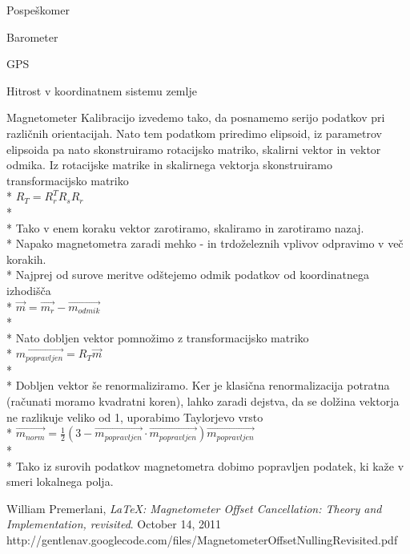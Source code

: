 \documentclass[]{article}
\begin{document}
\begin {subsection}{Pospeškomer}
\begin {subsection}{Barometer}
\begin {subsection}{GPS}
\begin {subsection}{Hitrost v koordinatnem sistemu zemlje}
\begin {subsection}{Magnetometer}
Kalibracijo izvedemo tako, da posnamemo serijo podatkov pri različnih orientacijah. Nato tem podatkom priredimo elipsoid, iz parametrov elipsoida pa nato skonstruiramo rotacijsko matriko, skalirni vektor in vektor odmika.
Iz rotacijske matrike in skalirnega vektorja skonstruiramo transformacijsko matriko\\*
$ R_{T} = R^{T}_{r}  R_{s}  R_{r} $\\*\\*
Tako v enem koraku vektor zarotiramo, skaliramo in zarotiramo nazaj.\\*
Napako magnetometra zaradi mehko - in trdoželeznih vplivov odpravimo v več korakih.\\*
Najprej od surove meritve odštejemo odmik podatkov od koordinatnega izhodišča\\*
$ \vec{m} = \vec{m_{r}} - \vec{m_{odmik}}  $\\*\\*
Nato dobljen vektor pomnožimo z transformacijsko matriko\\*
$ \vec{m_{popravljen}} = R_{T} \vec{m} $\\*\\*
Dobljen vektor še renormaliziramo. Ker je klasična renormalizacija potratna (računati moramo kvadratni koren), lahko zaradi dejstva, da se dolžina vektorja ne razlikuje veliko od 1, uporabimo Taylorjevo vrsto\\*
$ \vec{m_{norm}} = \frac{1}{2}(3 - \vec{m_{popravljen}} \cdot \vec{m_{popravljen}} )\vec{m_{popravljen}} $\\*\\*
Tako iz surovih podatkov magnetometra dobimo popravljen podatek, ki kaže v smeri lokalnega polja.

\end {subsection}

\end{subsection}
\end{subsection}
\end{subsection}
\end{subsection}

\begin{bibliography}{9}

  William Premerlani,
  \emph{\LaTeX: Magnetometer Offset Cancellation: Theory and Implementation, revisited}.
  October 14, 2011
  http://gentlenav.googlecode.com/files/MagnetometerOffsetNullingRevisited.pdf

\end{bibliography}
\end{document}
